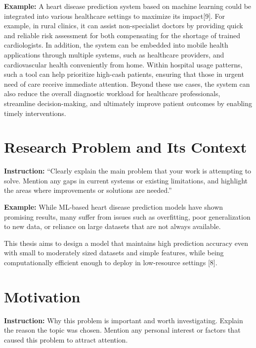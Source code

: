  \textbf{\color{blue} Example:} A heart disease prediction system based on machine learning could be integrated into various healthcare settings to maximize its impact[9]. For example, in rural clinics, it can assist non-specialist doctors by providing quick and reliable risk assessment for both compensating for the shortage of trained cardiologists. In addition, the system can be embedded into mobile health applications through multiple systems, such as healthcare providers, and cardiovascular health conveniently from home. Within hospital usage patterns, such a tool can help prioritize high-cash patients, ensuring that those in urgent need of care receive immediate attention. Beyond these use cases, the system can also reduce the overall diagnostic workload for healthcare professionals, streamline decision-making, and ultimately improve patient outcomes by enabling timely interventions.




\section{Research Problem and Its Context} 

{\color{red} \textbf{  Instruction:} “Clearly explain the main problem that your work is attempting to solve. Mention any gaps in current systems or existing limitations, and highlight the areas where improvements or solutions are needed.”}

 \textbf{\color{blue} Example:}
 While ML-based heart disease prediction models have shown promising results, many suffer from issues such as overfitting, poor generalization to new data, or reliance on large datasets that are not always available.

This thesis aims to design a model that maintains high prediction accuracy even with small to moderately sized datasets and simple features, while being computationally efficient enough to deploy in low-resource settings [8].


\section{Motivation}

{\color{red} \textbf{  Instruction:} Why this problem is important and worth investigating. Explain the reason the topic was chosen. Mention any personal interest or factors that caused this problem to attract attention.}

